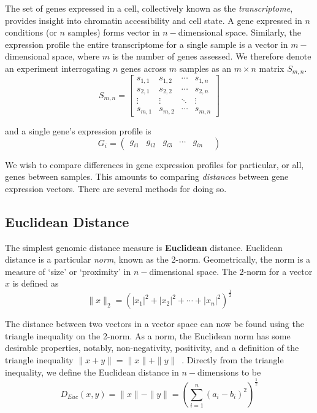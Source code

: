 The set of genes expressed in a cell, collectively known as the \textit{transcriptome}, provides insight into chromatin accessibility
and cell state.  A gene expressed in $n$ conditions (or $n$ samples) forms vector in $n-$dimensional space.  Similarly, the expression
profile the entire transcriptome for a single sample is a vector in $m-$dimensional space, where $m$ is the number of genes assessed.
We therefore denote an experiment interrogating $n$ genes across $m$ samples as an $m \times n$ matrix $S_{m,n}$.
\[
  S_{m,n} = \left[
    \begin{array}{cccc}
      s_{1,1} & s_{1,2} & \cdots & s_{1,n} \\
      s_{2,1} & s_{2,2} & \cdots & s_{2,n} \\
      \vdots & \vdots & \ddots  & \vdots \\
      s_{m,1} & s_{m,2} & \cdots & s_{m,n}
    \end{array}
  \right]
\]

and a single gene's expression profile is
\[ G_{i} = \begin{pmatrix} g_{i1} & g_{i2} & g_{i3} & \cdots & g_{in} & \end{pmatrix} \]

We wish to compare differences in gene expression profiles for particular, or all, genes between samples.  This amounts to comparing
\textit{distances} between gene expression vectors.  There are several methods for doing so.

\subsection*{Euclidean Distance}

The simplest genomic distance measure is \textbf{Euclidean} distance.  Euclidean distance is a particular \textit{norm}, known as
the 2-norm.  Geometrically, the norm is a measure of `size' or `proximity' in $n-$dimensional space.  The 2-norm for a vector $x$ is
defined as
\[
  \|x\|_{2} = {(|x_1|^2 + |x_2|^2 + \cdots + |x_n|^2)}^{\frac{1}{2}}
\]

The distance between two vectors in a vector space can now be found using the triangle inequality on the 2-norm.  As a norm, the Euclidean
norm has some desirable properties, notably, non-negativity, positivity, and a definition of the triangle inequality
$\|x + y\| = \|x\| + \|y\|$~\cite{horn2013}.  Directly from the triangle inequality, we define the Euclidean distance in $n-$dimensions to
be
\[
  D_{Euc}(x,y) = \|x\| - \|y\| = {(\sum_{i = 1}^{n}{(a_i - b_i)}^2)}^{\frac{1}{2}}
\]

